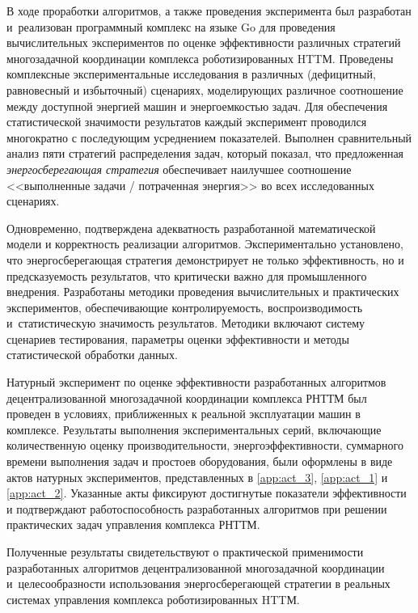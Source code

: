 
В ходе проработки алгоритмов, а также проведения эксперимента был разработан и~реализован программный комплекс на языке Go для проведения вычислительных экспериментов по оценке эффективности различных стратегий многозадачной координации комплекса роботизированных HTTМ. Проведены комплексные экспериментальные исследования в различных (дефицитный, равновесный и избыточный) сценариях, моделирующих различное соотношение между доступной энергией машин и энергоемкостью задач. Для обеспечения статистической значимости результатов каждый эксперимент проводился многократно с последующим усреднением показателей. Выполнен сравнительный анализ пяти стратегий распределения задач, который показал, что предложенная \textit{энергосберегающая стратегия} обеспечивает наилучшее соотношение <<выполненные задачи / потраченная энергия>> во всех исследованных сценариях.

Одновременно, подтверждена адекватность разработанной математической модели и корректность реализации алгоритмов. Экспериментально установлено, что энергосберегающая стратегия демонстрирует не только эффективность, но и предсказуемость результатов, что критически важно для промышленного внедрения. Разработаны методики проведения вычислительных и практических экспериментов, обеспечивающие контролируемость, воспроизводимость и~статистическую значимость результатов. Методики включают систему сценариев тестирования, параметры оценки эффективности и методы статистической обработки данных.

Натурный эксперимент по оценке эффективности разработанных алгоритмов децентрализованной многозадачной координации комплекса РНТТМ был проведен в условиях, приближенных к реальной эксплуатации машин в комплексе. Результаты выполнения экспериментальных серий, включающие количественную оценку производительности, энергоэффективности, суммарного времени выполнения задач и простоев оборудования, были оформлены в виде актов натурных экспериментов, представленных в \ref{app:act_3}, \ref{app:act_1} и \ref{app:act_2}. Указанные акты фиксируют достигнутые показатели эффективности и подтверждают работоспособность разработанных алгоритмов при решении практических задач управления комплекса РНТТМ.

Полученные результаты свидетельствуют о практической применимости разработанных алгоритмов децентрализованной многозадачной координации и~целесообразности использования энергосберегающей стратегии в реальных системах управления комплекса роботизированных HTTМ.

\FloatBarrier
